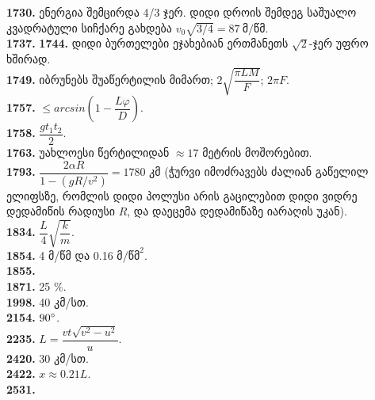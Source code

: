 \documentclass[12pt,a4paper,]{report}
\begin{document}
\textbf{1730.} ენერგია შემცირდა 4/3 ჯერ. დიდი დროის შემდეგ საშუალო კვადრატული სიჩქარე გახდება $v_0 \sqrt{3/4} = 87\ \text{მ/წმ}$. \\
\textbf{1737.} 
\textbf{1744.} დიდი ბურთელები ეჯახებიან ერთმანეთს $\sqrt{2}$-ჯერ უფრო ხშირად. \\
\textbf{1749.} იბრუნებს შუაწერტილის მიმართ; $2\sqrt{\dfrac{\pi LM}{F}}$; $2\pi F$. \\
\textbf{1757.} $\leq arcsin\left(1-\dfrac{L\varphi}{D} \right)$. \\
\textbf{1758.} $\dfrac{gt_1 t_2}{2}$. \\
\textbf{1763.} უახლოესი წერტილიდან $\approx 17$ მეტრის მოშორებით. \\
\textbf{1793.} $\dfrac{2\alpha R}{1 - (gR/v^2)} = 1780$ კმ (ჭურვი იმოძრავებს ძალიან გაწელილ ელიფსზე, რომლის დიდი პოლუსი არის გაცილებით დიდი ვიდრე დედამიწის რადიუსი $R$, და დაეცემა დედამიწაზე იარაღის უკან). \\
\textbf{1834.} $\dfrac{L}{4}\sqrt{\dfrac{k}{m}}$. \\
\textbf{1854.} 4 მ/წმ და 0.16 $\text{მ}/\text{წმ}^2$. \\
\textbf{1855.} \\
\textbf{1871.} 25 $\%$. \\
\textbf{1998.} 40 კმ/სთ. \\
\textbf{2154.} $90 \degree$. \\
\textbf{2235.} $L=\dfrac{vt\sqrt{v^2-u^2}}{u}$. \\
\textbf{2420.} 30 კმ/სთ. \\
\textbf{2422.} $x\approx0.21L$. \\
\textbf{2531.} 
\end{document}
